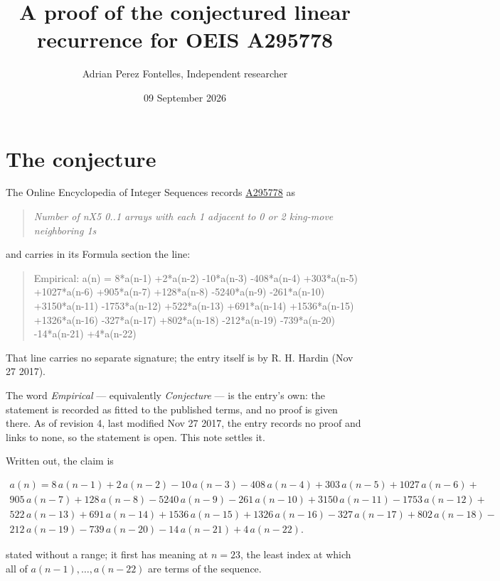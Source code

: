 \documentclass[11pt]{article}
\title{A proof of the conjectured linear recurrence for OEIS A295778}
\author{Adrian Perez Fontelles, Independent researcher}
\date{09 September 2026}
\theoremstyle{definition}
\begin{document}
\maketitle
\section{The conjecture}

The Online Encyclopedia of Integer Sequences records \href{https://oeis.org/A295778}{A295778} as

\begin{quote}\itshape Number of nX5 0..1 arrays with each 1 adjacent to 0 or 2 king-move neighboring 1s\end{quote}

and carries in its Formula section the line:

\begin{quote}\ttfamily Empirical: a(n) = 8*a(n-1) +2*a(n-2) -10*a(n-3) -408*a(n-4) +303*a(n-5) +1027*a(n-6) +905*a(n-7) +128*a(n-8) -5240*a(n-9) -261*a(n-10) +3150*a(n-11) -1753*a(n-12) +522*a(n-13) +691*a(n-14) +1536*a(n-15) +1326*a(n-16) -327*a(n-17) +802*a(n-18) -212*a(n-19) -739*a(n-20) -14*a(n-21) +4*a(n-22)\end{quote}

That line carries no separate signature; the entry itself is by R. H. Hardin (Nov 27 2017).

The word {\itshape Empirical} --- equivalently {\itshape Conjecture} --- is the entry's own: the statement is recorded as fitted to the published terms, and no proof is given there. As of revision 4, last modified Nov 27 2017, the entry records no proof and links to none, so the statement is open. This note settles it.

Written out, the claim is

\begin{multline*} a(n) = 8\,a(n-1) + 2\,a(n-2) - 10\,a(n-3) - 408\,a(n-4) + 303\,a(n-5) + 1027\,a(n-6) + \\ 905\,a(n-7) + 128\,a(n-8) - 5240\,a(n-9) - 261\,a(n-10) + 3150\,a(n-11) - 1753\,a(n-12) + \\ 522\,a(n-13) + 691\,a(n-14) + 1536\,a(n-15) + 1326\,a(n-16) - 327\,a(n-17) + 802\,a(n-18) - \\ 212\,a(n-19) - 739\,a(n-20) - 14\,a(n-21) + 4\,a(n-22). \end{multline*}

stated without a range; it first has meaning at $n = 23$, the least index at which all of $a(n-1),\dots,a(n-22)$ are terms of the sequence.
\end{document}

